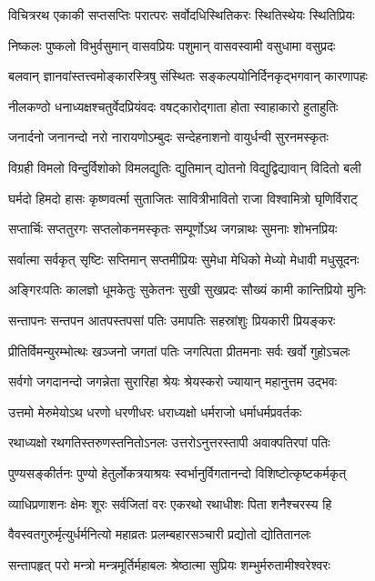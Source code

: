 \twolineshloka
{विचित्ररथ एकाकी सप्तसप्तिः परात्परः}
{सर्वोदधिस्थितिकरः स्थितिस्थेयः स्थितिप्रियः}%

\twolineshloka
{निष्कलः पुष्कलो विभुर्वसुमान् वासवप्रियः}
{पशुमान् वासवस्वामी वसुधामा वसुप्रदः}%

\twolineshloka
{बलवान् ज्ञानवांस्तत्त्वमोङ्कारस्त्रिषु संस्थितः}
{सङ्कल्पयोनिर्दिनकृद्भगवान् कारणापहः}%

\twolineshloka
{नीलकण्ठो धनाध्यक्षश्चतुर्वेदप्रियंवदः}
{वषट्कारोद्गाता होता स्वाहाकारो हुताहुतिः}%

\twolineshloka
{जनार्दनो जनानन्दो नरो नारायणोऽम्बुदः}
{सन्देहनाशनो वायुर्धन्वी सुरनमस्कृतः}%

\twolineshloka
{विग्रही विमलो विन्दुर्विशोको विमलद्युतिः}
{द्युतिमान् द्योतनो विद्युद्विद्यावान् विदितो बली}%

\twolineshloka
{घर्मदो हिमदो हासः कृष्णवर्त्मा सुताजितः}
{सावित्रीभावितो राजा विश्वामित्रो घृणिर्विराट्}%

\twolineshloka
{सप्तार्चिः सप्ततुरगः सप्तलोकनमस्कृतः}
{सम्पूर्णोऽथ जगन्नाथः सुमनाः शोभनप्रियः}%

\twolineshloka
{सर्वात्मा सर्वकृत् सृष्टिः सप्तिमान् सप्तमीप्रियः}
{सुमेधा मेधिको मेध्यो मेधावी मधुसूदनः}%

\twolineshloka
{अङ्गिरःपतिः कालज्ञो धूमकेतुः सुकेतनः}
{सुखी सुखप्रदः सौख्यं कामी कान्तिप्रियो मुनिः}%

\twolineshloka
{सन्तापनः सन्तपन आतपस्तपसां पतिः}
{उमापतिः सहस्रांशुः प्रियकारी प्रियङ्करः}%

\twolineshloka
{प्रीतिर्विमन्युरम्भोत्थः खञ्जनो जगतां पतिः}
{जगत्पिता प्रीतमनाः सर्वः खर्वो गुहोऽचलः}%

\twolineshloka
{सर्वगो जगदानन्दो जगन्नेता सुरारिहा}
{श्रेयः श्रेयस्करो ज्यायान् महानुत्तम उद्भवः}%

\twolineshloka
{उत्तमो मेरुमेयोऽथ धरणो धरणीधरः}
{धराध्यक्षो धर्मराजो धर्माधर्मप्रवर्तकः}%

\twolineshloka
{रथाध्यक्षो रथगतिस्तरुणस्तनितोऽनलः}
{उत्तरोऽनुत्तरस्तापी अवाक्पतिरपां पतिः}%

\twolineshloka
{पुण्यसङ्कीर्तनः पुण्यो हेतुर्लोकत्रयाश्रयः}
{स्वर्भानुर्विगतानन्दो विशिष्टोत्कृष्टकर्मकृत्}%

\twolineshloka
{व्याधिप्रणाशनः क्षेमः शूरः सर्वजितां वरः}
{एकरथो रथाधीशः पिता शनैश्चरस्य हि}%

\twolineshloka
{वैवस्वतगुरुर्मृत्युर्धर्मनित्यो महाव्रतः}
{प्रलम्बहारसञ्चारी प्रद्योतो द्योतितानलः}%

\twolineshloka
{सन्तापहृत् परो मन्त्रो मन्त्रमूर्तिर्महाबलः}
{श्रेष्ठात्मा सुप्रियः शम्भुर्मरुतामीश्वरेश्वरः}%

